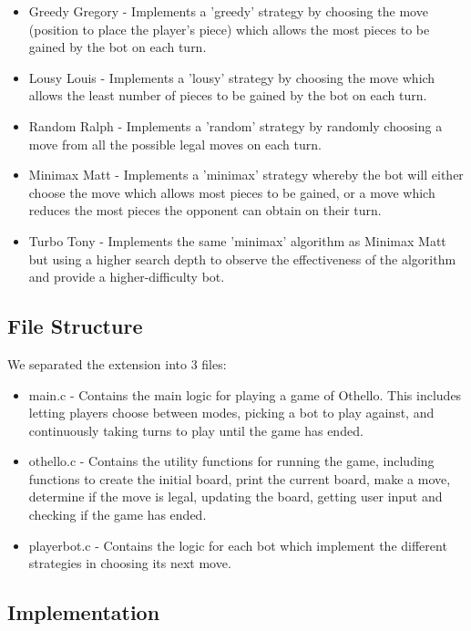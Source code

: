 \documentclass[a4paper,11pt]{article}
\begin{document}
\begin{itemize}
\item Greedy Gregory - Implements a 'greedy' strategy by choosing the move (position to place the player's piece) which allows the most pieces to be gained by the bot on each turn.

\item Lousy Louis - Implements a 'lousy' strategy by choosing the move which allows the least number of pieces to be gained by the bot on each turn.

\item Random Ralph - Implements a 'random' strategy by randomly choosing a move from all the possible legal moves on each turn.

\item Minimax Matt - Implements a 'minimax' strategy whereby the bot will either choose the move which allows most pieces to be gained, or a move which reduces the most pieces the opponent can obtain on their turn.

\item Turbo Tony - Implements the same 'minimax' algorithm as Minimax Matt but using a higher search depth to observe the effectiveness of the algorithm and provide a higher-difficulty bot.
\end{itemize}

\subsection{File Structure}
We separated the extension into 3 files:
\begin{itemize}
\item main.c - Contains the main logic for playing a game of Othello. This includes letting players choose between modes, picking a bot to play against, and continuously taking turns to play until the game has ended.

\item othello.c - Contains the utility functions for running the game, including functions to create the initial board, print the current board, make a move, determine if the move is legal, updating the board, getting user input and checking if the game has ended.

\item playerbot.c - Contains the logic for each bot which implement the different strategies in choosing its next move.
\end{itemize} 


\subsection{Implementation}
\end{document}
